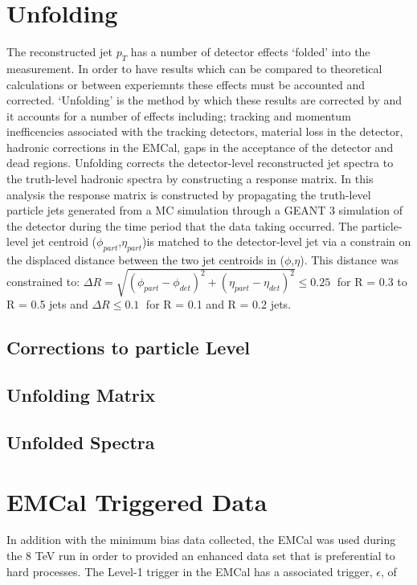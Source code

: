 \section{Unfolding}

The reconstructed jet $p_{T}$ has a number of detector effects `folded' into the measurement.  In order to have results which can be compared to theoretical calculations or between experiemnts these effects must be accounted and corrected.  `Unfolding' is the method by which these results are corrected by and it accounts for a number of effects including; tracking and momentum inefficencies associated with the tracking detectors, material loss in the detector, hadronic corrections in the EMCal, gaps in the acceptance of the detector and dead regions.  Unfolding corrects the detector-level reconstructed jet spectra to the truth-level  hadronic spectra by constructing a response matrix. In this analysis the response matrix is constructed by propagating the truth-level particle jets generated from a MC simulation through a GEANT 3 simulation of the detector during the time period that the data taking occurred.  The particle-level jet centroid ($\phi_{part}$,$\eta_{part}$)is matched to the detector-level jet via a constrain on the displaced distance between the two jet centroids in ($\phi$,$\eta$).  This distance was constrained to: $\Delta  R = \sqrt{(\phi_{part} - \phi_{det})^{2} + (\eta_{part} - \eta_{det})^{2}} \leq 0.25 \; $ for R = 0.3 to R = 0.5 jets and $\Delta R \leq 0.1 \;$ for R = 0.1 and R = 0.2 jets.

\subsection{Corrections to particle Level}

\subsection{Unfolding Matrix}

\subsection{Unfolded Spectra}

\section{EMCal Triggered Data}

In addition with the minimum bias data collected, the EMCal was used during the 8 TeV run in order to provided an enhanced data set that is preferential to hard processes.   The Level-1 trigger\cite{Bourrion:2010js} in the EMCal has a associated trigger, $\epsilon$, of 

